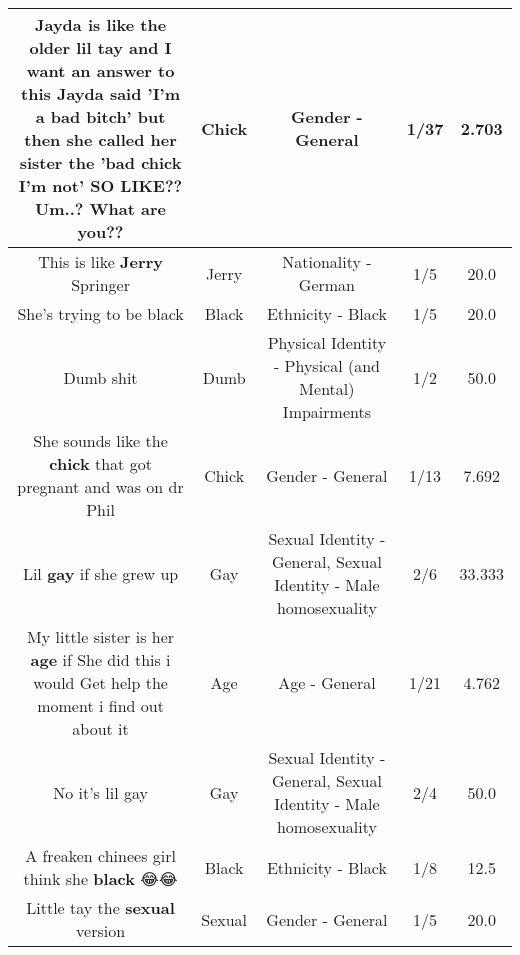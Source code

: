\documentclass[11pt]{article}
\newlength\mylength
\begin{document}
\begin{center}
\begin{longtable}{|C{.65\mylength}|C{.30\mylength}|C{.12\mylength}|C{.12\mylength}|C{.12\mylength}|}
  \small Jayda is like the older lil tay and I want an answer to this Jayda said 'I'm a bad bitch' but then she called her sister the 'bad \textbf{chick} I'm not' SO LIKE?? Um..? What are you??\normalsize   & Chick & Gender - General & 1/37 & 2.703 \\  \hline
  \small This is like \textbf{Jerry} Springer\normalsize   & Jerry & Nationality - German & 1/5 & 20.0 \\  \hline
  \small She's trying to be black\normalsize   & Black & Ethnicity - Black & 1/5 & 20.0 \\  \hline
  \small Dumb shit\normalsize   & Dumb & Physical Identity - Physical (and Mental) Impairments & 1/2 & 50.0 \\  \hline
  \small She sounds like the \textbf{chick} that got pregnant and was on dr Phil\normalsize   & Chick & Gender - General & 1/13 & 7.692 \\  \hline
  \small Lil \textbf{g\textbf{ay}} if she grew up\normalsize   & Gay & Sexual Identity - General, Sexual Identity - Male homosexuality & 2/6 & 33.333 \\  \hline
  \small My little sister is her \textbf{age} if She did this i would Get help the moment i find out about it\normalsize   & Age & Age - General & 1/21 & 4.762 \\  \hline
  \small No it's lil gay\normalsize   & Gay & Sexual Identity - General, Sexual Identity - Male homosexuality & 2/4 & 50.0 \\  \hline
  \small A freaken chinees girl think she \textbf{black} 😂😂\normalsize   & Black & Ethnicity - Black & 1/8 & 12.5 \\  \hline
  \small Little tay the \textbf{sexual} version\normalsize   & Sexual & Gender - General & 1/5 & 20.0 \\  \hline

\end{longtable}
\end{center}
\end{document}
